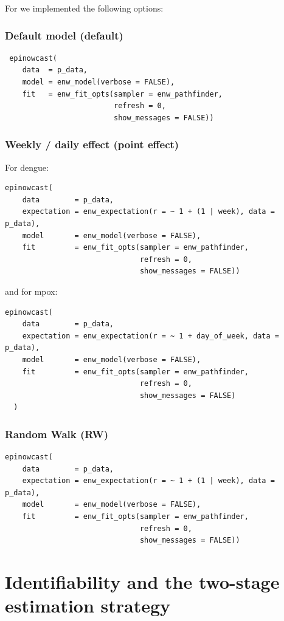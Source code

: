 \documentclass{article}
\begin{document}
For \cite{epinowcast} we implemented the following options:
\subsubsection{Default model (default)}
\begin{lstlisting}
 epinowcast(
    data  = p_data,
    model = enw_model(verbose = FALSE),
    fit   = enw_fit_opts(sampler = enw_pathfinder,
                         refresh = 0, 
                         show_messages = FALSE))
\end{lstlisting}


\subsubsection{Weekly / daily effect (point effect)}
For dengue:
\begin{lstlisting}
epinowcast(
    data        = p_data,
    expectation = enw_expectation(r = ~ 1 + (1 | week), data = p_data),
    model       = enw_model(verbose = FALSE),
    fit         = enw_fit_opts(sampler = enw_pathfinder,
                               refresh = 0, 
                               show_messages = FALSE))
\end{lstlisting}
and for mpox:
\begin{lstlisting}
epinowcast(
    data        = p_data,
    expectation = enw_expectation(r = ~ 1 + day_of_week, data = p_data),
    model       = enw_model(verbose = FALSE),
    fit         = enw_fit_opts(sampler = enw_pathfinder,
                               refresh = 0, 
                               show_messages = FALSE)
  )
\end{lstlisting}
\subsubsection{Random Walk (RW)}
\begin{lstlisting}
epinowcast(
    data        = p_data,
    expectation = enw_expectation(r = ~ 1 + (1 | week), data = p_data),
    model       = enw_model(verbose = FALSE),
    fit         = enw_fit_opts(sampler = enw_pathfinder,
                               refresh = 0, 
                               show_messages = FALSE))
\end{lstlisting}


\section{\color{red} Identifiability and the two-stage estimation strategy}
\end{document}

